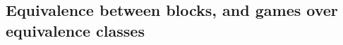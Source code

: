 \documentclass{article}
\begin{document}
%
%
%
%
%
%
%

\subsection{Equivalence between blocks, and games over equivalence classes}
\end{document}
